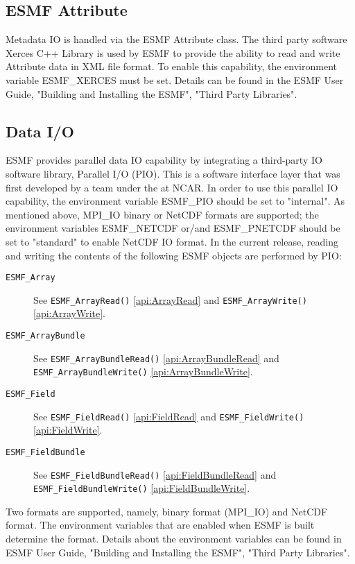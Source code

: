 \subsection{ESMF Attribute}

Metadata IO is handled via the ESMF Attribute class. The third
party software Xerces C++ Library is used by ESMF to provide
the ability to read and write Attribute data in XML file format.
To enable this capability, the environment variable ESMF\_XERCES must be
set. Details can be found in the ESMF User Guide, "Building and Installing the ESMF", "Third Party Libraries".


\subsection{Data I/O}

ESMF provides parallel data IO capability by integrating a third-party IO
software library, Parallel I/O (PIO). This is a software interface layer that
was first developed by a team under the  at NCAR.
In order to use this parallel IO capability, the environment variable ESMF\_PIO should
be set to "internal".  As mentioned above, MPI_IO binary or NetCDF formats 
are supported; the environment variables ESMF\_NETCDF or/and ESMF\_PNETCDF
should be set to "standard" to enable NetCDF IO format.
In the current release, reading and writing the contents of the following ESMF objects are performed by PIO:

\begin{description}
\item[\tt ESMF\_Array] See {\tt ESMF\_ArrayRead()} \ref{api:ArrayRead} and 
{\tt ESMF\_ArrayWrite()} \ref{api:ArrayWrite}.
\item[\tt ESMF\_ArrayBundle] See {\tt ESMF\_ArrayBundleRead()} 
\ref{api:ArrayBundleRead} and 
{\tt ESMF\_ArrayBundleWrite()} \ref{api:ArrayBundleWrite}.
\item[\tt ESMF\_Field] See {\tt ESMF\_FieldRead()} \ref{api:FieldRead} and 
{\tt ESMF\_FieldWrite()} \ref{api:FieldWrite}.
\item[\tt ESMF\_FieldBundle] See {\tt ESMF\_FieldBundleRead()} 
\ref{api:FieldBundleRead} and {\tt ESMF\_FieldBundleWrite()} 
\ref{api:FieldBundleWrite}.
\end{description}

Two formats are supported, namely, binary format (MPI\_IO) and NetCDF format. 
The environment variables that are enabled when ESMF is built determine the format.  Details about the environment variables can be found in ESMF User Guide, 
"Building and Installing the ESMF", "Third Party Libraries".



